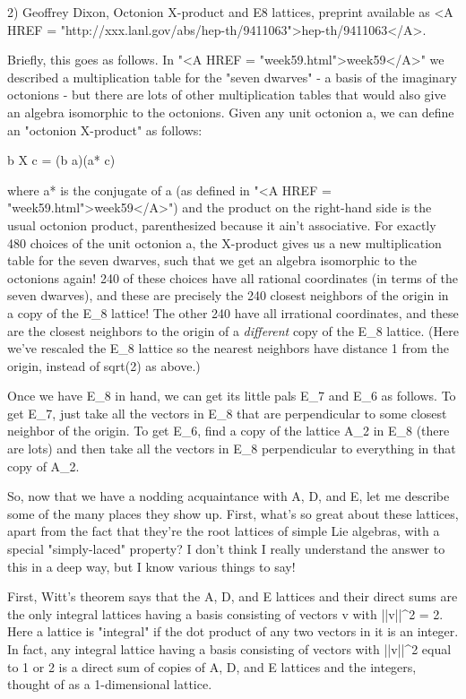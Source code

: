 2) Geoffrey Dixon, Octonion X-product and E8 lattices, preprint
available as <A HREF = "http://xxx.lanl.gov/abs/hep-th/9411063">hep-th/9411063</A>.


Briefly, this goes as follows.  In "<A HREF = "week59.html">week59</A>"
we described a multiplication table for the "seven dwarves" - a basis of
the imaginary octonions - but there are lots of other multiplication
tables that would also give an algebra isomorphic to the octonions.
Given any unit octonion a, we can define an "octonion X-product" as
follows:

b X c = (b a)(a* c)

where a* is the conjugate of a (as defined in "<A HREF =
"week59.html">week59</A>") and the product on the right-hand side is the
usual octonion product, parenthesized because it ain't associative.  For
exactly 480 choices of the unit octonion a, the X-product gives us a new
multiplication table for the seven dwarves, such that we get an algebra
isomorphic to the octonions again!  240 of these choices have all
rational coordinates (in terms of the seven dwarves), and these are
precisely the 240 closest neighbors of the origin in a copy of the
E_{8} lattice!  The other 240 have all irrational coordinates,
and these are the closest neighbors to the origin of a
\emph{different} copy of the E_{8} lattice.  (Here we've
rescaled the E_{8} lattice so the nearest neighbors have
distance 1 from the origin, instead of sqrt(2) as above.)



Once we have E_{8} in hand, we can get its little pals
E_{7} and E_{6} as follows.  To get E_{7}, just
take all the vectors in E_{8} that are perpendicular to some
closest neighbor of the origin.  To get E_{6}, find a copy of
the lattice A_{2} in E_{8} (there are lots) and then take all the
vectors in E_{8} perpendicular to everything in that copy of
A_{2}.

So, now that we have a nodding acquaintance with A, D, and E, let me
describe some of the many places they show up.  First, what's so
great about these lattices, apart from the fact that they're the
root lattices of simple Lie algebras, with a special "simply-laced"
property?   I don't think I really understand the answer to this in 
a deep way, but I know various things to say!  


First, Witt's theorem says that the A, D, and E lattices and their
direct sums are the only integral lattices having a basis consisting of
vectors v with ||v||^{2} = 2.  Here a lattice is "integral" if
the dot product of any two vectors in it is an integer.  In fact, any
integral lattice having a basis consisting of vectors with
||v||^{2} equal to 1 or 2 is a direct sum of copies of A, D, and
E lattices and the integers, thought of as a 1-dimensional lattice.

